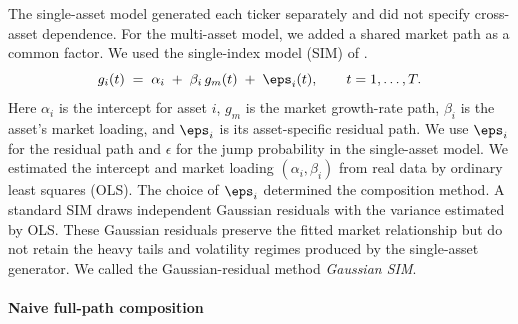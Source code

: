 
The single-asset model generated each ticker separately and did not
specify cross-asset dependence. For the multi-asset model, we added a
shared market path as a common factor. We used the single-index model
(SIM) of \citet{sharpe1963}.
\begin{equation}
  g_i(t) \;=\; \alpha_i \;+\; \beta_i\, g_m(t) \;+\; \eps_i(t),
  \qquad t = 1,\dots,T.
  \label{eq:sim-composition}
\end{equation}
Here $\alpha_i$ is the intercept for asset $i$, $g_m$ is the market
growth-rate path, $\beta_i$ is the asset's market loading, and
$\eps_i$ is its asset-specific residual path. We use $\eps_i$ for the
residual path and $\epsilon$ for the jump probability in the
single-asset model. We estimated the intercept and market loading
$(\alpha_i,\beta_i)$ from real data by
ordinary least squares (OLS). The choice of $\eps_i$ determined the
composition method. A standard SIM draws independent Gaussian residuals
with the variance estimated by OLS. These Gaussian residuals preserve
the fitted market relationship but do not retain the heavy tails and
volatility regimes produced by the single-asset generator. We called
the Gaussian-residual method \emph{Gaussian SIM}.

\paragraph{Naive full-path composition}

